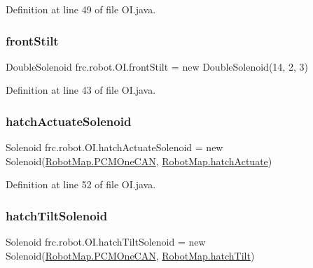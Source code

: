 Definition at line 49 of file O\+I.\+java.

\mbox{\label{classfrc_1_1robot_1_1_o_i_a4f6b2dd823bad92cfaf2e9ecc7c0b1ca}} 
\subsubsection{\texorpdfstring{front\+Stilt}{frontStilt}}
{\footnotesize\ttfamily Double\+Solenoid frc.\+robot.\+O\+I.\+front\+Stilt = new Double\+Solenoid(14, 2, 3)\hspace{0.3cm}{\ttfamily [static]}}



Definition at line 43 of file O\+I.\+java.

\mbox{\label{classfrc_1_1robot_1_1_o_i_a232ad4f80d75cd3d48c2067251c59817}} 
\subsubsection{\texorpdfstring{hatch\+Actuate\+Solenoid}{hatchActuateSolenoid}}
{\footnotesize\ttfamily Solenoid frc.\+robot.\+O\+I.\+hatch\+Actuate\+Solenoid = new Solenoid(\hyperlink{classfrc_1_1robot_1_1_robot_map_a79a848df56d706c787d9a4f9a0434e7f}{Robot\+Map.\+P\+C\+M\+One\+C\+AN}, \hyperlink{classfrc_1_1robot_1_1_robot_map_a7bec1963c7590911eb30697b0707d9b4}{Robot\+Map.\+hatch\+Actuate})\hspace{0.3cm}{\ttfamily [static]}}



Definition at line 52 of file O\+I.\+java.

\mbox{\label{classfrc_1_1robot_1_1_o_i_aa8cdb6b236dfb9fead12621b4f42c274}} 
\subsubsection{\texorpdfstring{hatch\+Tilt\+Solenoid}{hatchTiltSolenoid}}
{\footnotesize\ttfamily Solenoid frc.\+robot.\+O\+I.\+hatch\+Tilt\+Solenoid = new Solenoid(\hyperlink{classfrc_1_1robot_1_1_robot_map_a79a848df56d706c787d9a4f9a0434e7f}{Robot\+Map.\+P\+C\+M\+One\+C\+AN}, \hyperlink{classfrc_1_1robot_1_1_robot_map_a0c656cb43ea0fd37d6b94991e8473bf9}{Robot\+Map.\+hatch\+Tilt})\hspace{0.3cm}{\ttfamily [static]}}



